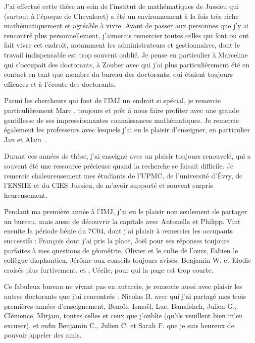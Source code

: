 \medskip

J'ai effectué cette thèse au sein de l'institut de mathématiques de Jussieu
qui (surtout à l'époque de Chevaleret) a été un environnement à la fois très
riche mathématiquement et agréable à vivre. Avant de passer aux personnes que
j'y ai rencontré plus personnellement, j'aimerais remercier toutes celles qui
font ou ont fait vivre cet endroit, notamment les administrateurs et
gestionnaires, dont le travail indispensable est trop souvent oublié. Je pense
en particulier à Marceline  qui s'occupait des doctorants, à
Zouber  avec qui j'ai plus particulièrement été en contact en tant
que membre du bureau des doctorants, qui étaient toujours efficaces et à
l'écoute des doctorants.

Parmi les chercheurs qui font de l'IMJ un endroit si spécial, je remercie
particulièrement Marc , toujours et prêt à nous faire profiter
avec une grande gentillesse de ses impressionnantes connaissances
mathématiques. Je remercie également les professeurs avec lesquels j'ai eu le
plaisir d'enseigner, en particulier Jan  et Alain .

Durant ces années de thèse, j'ai enseigné avec un plaisir toujours
renouvelé, qui a souvent été une ressource précieuse quand la recherche se
faisait difficile. Je remercie chaleureusement mes étudiants de l'UPMC, de
l'université d'Évry, de l'ENSIIE et du CIES Jussieu, de m'avoir
supporté et souvent surpris heureusement.

\medskip

Pendant ma première année à l'IMJ, j'ai eu le plaisir non seulement de
partager un bureau, mais aussi de découvrir la capitale avec Antonella et
Philipp. Vint ensuite la période bénie du 7C04, dont j'ai plaisir à remercier
les occupants successifs : François dont j'ai pris la place, Joël pour ses
réponses toujours parfaites à mes questions de géométrie, Olivier et le culte
de l'ours, Fabien le collègue diophantien, Jérôme aux conseils toujours
avisés, Benjamin W. et Élodie croisés plus furtivement, et , Cécile, pour qui la page est trop courte.

Ce fabuleux bureau ne vivant pas en autarcie, je remercie aussi avec plaisir
les autres doctorants que j'ai rencontrés : Nicolas B. avec qui j'ai partagé
mes trois premières années d'enseignement, Benoît, Ismaël, Luc, Banafsheh,
Julien G., Clémence, Mirjam, toutes celles et ceux que j'oublie (qu'ils
veuillent bien m'en excuser), et enfin Benjamin C., Julien C. et Sarah F.
que je suis heureux de pouvoir appeler des amis.


